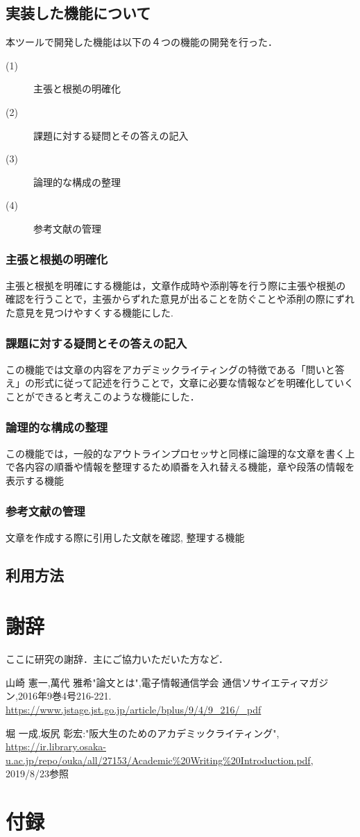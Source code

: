 \documentclass[a4j,12pt]{jarticle}
\begin{document}
\subsection{実装した機能について}
本ツールで開発した機能は以下の４つの機能の開発を行った．
\begin{description}
  \item[(1)] 主張と根拠の明確化
  \item[(2)] 課題に対する疑問とその答えの記入
  \item[(3)] 論理的な構成の整理
  \item[(4)] 参考文献の管理
 \end{description}
\subsubsection{主張と根拠の明確化}
主張と根拠を明確にする機能は，文章作成時や添削等を行う際に主張や根拠の確認を行うことで，主張からずれた意見が出ることを防ぐことや添削の際にずれた意見を見つけやすくする機能にした.　
\subsubsection{課題に対する疑問とその答えの記入}
この機能では文章の内容をアカデミックライティングの特徴である「問いと答え」の形式に従って記述を行うことで，文章に必要な情報などを明確化していくことができると考えこのような機能にした．
\subsubsection{論理的な構成の整理}
この機能では，一般的なアウトラインプロセッサと同様に論理的な文章を書く上で各内容の順番や情報を整理するため順番を入れ替える機能，章や段落の情報を表示する機能
\subsubsection{参考文献の管理}
文章を作成する際に引用した文献を確認, 整理する機能
\subsection{利用方法}

\newpage

\section*{謝辞}

ここに研究の謝辞．主にご協力いただいた方など．

\newpage
{}
 \begin{thebibliography}{99}
山崎 憲一,萬代 雅希"論文とは",電子情報通信学会 通信ソサイエティマガジン,2016年9巻4号216-221.
\url{https://www.jstage.jst.go.jp/article/bplus/9/4/9_216/_pdf}

 堀 一成,坂尻 彰宏:"阪大生のためのアカデミックライティング",
\url{https://ir.library.osaka-u.ac.jp/repo/ouka/all/27153/Academic%20Writing%20Introduction.pdf}, 2019/8/23参照
\end{thebibliography}

\section*{付録}

\end{document}
